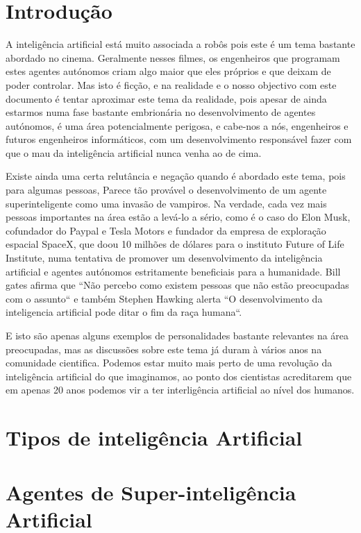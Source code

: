 \documentclass[runningheads,a4paper]{llncs}
\begin{document}
\section{Introdução}

A inteligência artificial está muito associada a robôs pois este é um tema bastante abordado no cinema. Geralmente nesses filmes, os engenheiros que programam estes agentes autónomos criam algo maior que eles próprios e que deixam de poder controlar. Mas isto é ficção, e na realidade e o nosso objectivo com este documento é tentar aproximar este tema da realidade, pois apesar de ainda estarmos numa fase bastante embrionária no desenvolvimento de agentes autónomos, é uma área potencialmente perigosa, e cabe-nos a nós, engenheiros e futuros engenheiros informáticos, com um desenvolvimento responsável fazer com que o mau da inteligência artificial nunca venha ao de cima.

Existe ainda uma certa relutância e negação quando é abordado este tema, pois para algumas pessoas, Parece tão provável o desenvolvimento de um agente superinteligente como uma invasão de vampiros. Na verdade, cada vez mais pessoas importantes na área estão a levá-lo a sério, como é o caso do Elon Musk, cofundador do Paypal e Tesla Motors e fundador da empresa de exploração espacial SpaceX, que doou 10 milhões de dólares para o instituto Future of Life Institute\cite{FLI}, numa tentativa de promover um desenvolvimento da inteligência artificial e agentes autónomos estritamente beneficiais para a humanidade. Bill gates afirma que ``Não percebo como existem pessoas que não estão preocupadas com o assunto``\cite{gates} e também Stephen Hawking alerta ``O desenvolvimento da inteligencia artificial pode ditar o fim da raça humana``\cite{hawking}.

E isto são apenas alguns exemplos de personalidades bastante relevantes na área preocupadas, mas as discussões sobre este tema já duram à vários anos na comunidade cientifica. Podemos estar muito mais perto de uma revolução da inteligência artificial do que imaginamos, ao ponto dos cientistas acreditarem que em apenas 20 anos podemos vir a ter interligência artificial ao nível dos humanos.

\section{Tipos de inteligência Artificial}

\section{Agentes de Super-inteligência Artificial}
\end{document}
